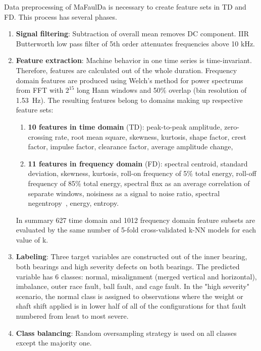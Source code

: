 \documentclass{llncs}
\begin{document}
Data preprocessing of MaFaulDa is necessary to create feature sets in TD and FD. This process has several phases.
\begin{enumerate}
\item \textbf{Signal filtering}: Subtraction of overall mean removes DC component. IIR Butterworth low pass filter of 5th order attenuates frequencies above 10 kHz.
\item \textbf{Feature extraction}: Machine behavior in one time series is time-invariant. Therefore, features are calculated out of the whole duration. Frequency domain features are produced using Welch's method for power spectrums from FFT with $2^{15}$ long Hann windows and 50\% overlap  (bin resolution of 1.53~Hz). The resulting features belong to domains making up respective feature sets:
\begin{enumerate}
\item \textbf{10 features in time domain} (TD): peak-to-peak amplitude, zero-crossing rate, root mean square, skewness, kurtosis, shape factor, crest factor, impulse factor, clearance factor, average amplitude change,
\item \textbf{11 features in frequency domain} (FD): spectral centroid, standard deviation, skewness, kurtosis, roll-on frequency of 5\% total energy, roll-off frequency of 85\% total energy, spectral flux as an average correlation of separate windows, noisiness as a signal to noise ratio, spectral negentropy~\cite{avoci_spectral_2020}, energy, entropy.
\end{enumerate}
In summary 627 time domain and 1012 frequency domain feature subsets are evaluated by the same number of 5-fold cross-validated k-NN models for each value of k. 
\item \textbf{Labeling}: Three target variables are constructed out of the inner bearing, both bearings and high severity defects on both bearings. The predicted variable has 6 classes: normal, misalignment (merged vertical and horizontal), imbalance, outer race fault, ball fault, and cage fault. In the "high severity" scenario, the normal class is assigned to observations where the weight or shaft shift applied is in lower half of all of the configurations for that fault numbered from least to most severe.
\item \textbf{Class balancing}: Random oversampling strategy is used on all classes except the majority one.
\end{enumerate}
\end{document}
